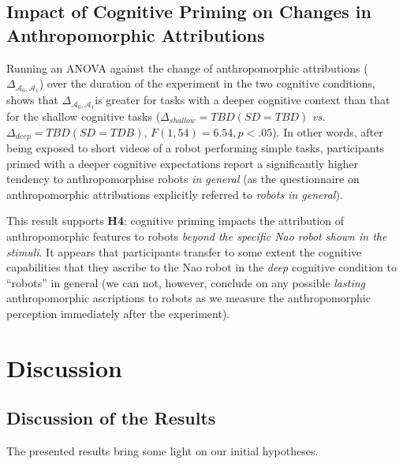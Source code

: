 \documentclass[lettersize, noapacite, twoside, HRI]{apa_HRI}
\newcommand{\vs}{\textit{vs.}\xspace}
\newcommand{\h}[1]{\textbf{H#1}\xspace}
\newcommand{\anti}{{$\mathcal{A}_0$\xspace}}
\newcommand{\antf}{{$\mathcal{A}_1$\xspace}}
\newcommand{\deltaant}{{ $\Delta_{\mathcal{A}_0,\mathcal{A}_1}$\xspace}}
\begin{document}
\subsection{Impact of Cognitive Priming on Changes in Anthropomorphic
Attributions}

Running an ANOVA against the change of anthropomorphic attributions
(\deltaant) over the duration of the experiment in the two cognitive
conditions, shows that \deltaant is greater for tasks with a deeper cognitive
context than that for the shallow cognitive tasks ($\Delta_{shallow}=TBD (SD=TBD)$
\vs $\Delta_{deep}=TBD (SD=TDB)$, $F(1,54) = 6.54, p < .05$). In other words, after being exposed to short videos of a robot
performing simple tasks, participants primed with a deeper cognitive
expectations report a significantly higher tendency to anthropomorphise robots
\emph{in general} (as the questionnaire on anthropomorphic attributions
explicitly referred to \emph{robots in general}).


This result supports \h{4}: cognitive priming impacts the
attribution of anthropomorphic features to robots \emph{beyond the specific Nao robot
shown in the stimuli}.  It appears that participants transfer to some extent the
cognitive capabilities that they ascribe to the Nao robot in the
\emph{deep} cognitive condition to ``robots'' in general (we can not, however,
conclude on any possible \emph{lasting} anthropomorphic ascriptions to robots as we
measure the anthropomorphic perception immediately after the experiment).


\section{Discussion}

\subsection{Discussion of the Results}

The presented results bring some light on our initial hypotheses.
\end{document}
